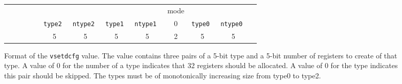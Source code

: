 \begin{figure}[b]
  \centering
  \begin{tabular}{p{1cm}p{1cm}ccc|c|c|c|c|c|c|c|l}
    \multicolumn{1}{c}{} &
    \multicolumn{1}{c}{} &
    \multicolumn{1}{c}{} &
    \multicolumn{1}{c}{} & 
    \multicolumn{1}{c}{} &
    \multicolumn{1}{c}{} &
    \multicolumn{1}{c}{} &
    \multicolumn{1}{c}{} &
    \multicolumn{1}{c}{} &
    \multicolumn{1}{c}{mode} &
    \multicolumn{1}{c}{} &
    \multicolumn{1}{c}{} &  \\
    \cline{6-12}
    & & & & &
    \tt type2 & \tt ntype2 &
    \tt type1 & \tt ntype1 &
    0 &
    \tt type0 & \tt ntype0 &  \\
    \cline{6-12}
    \multicolumn{1}{c}{} &
    \multicolumn{1}{c}{} &
    \multicolumn{1}{c}{} &
    \multicolumn{1}{c}{} & 
    \multicolumn{1}{c}{} &
    \multicolumn{1}{c}{5} &
    \multicolumn{1}{c}{5} &
    \multicolumn{1}{c}{5} &
    \multicolumn{1}{c}{5} &
    \multicolumn{1}{c}{2} &
    \multicolumn{1}{c}{5} &
    \multicolumn{1}{c}{5} &  \\
  \end{tabular}
  \caption{Format of the {\tt vsetdcfg} value.  The value contains
    three pairs of a 5-bit type and a 5-bit number of registers
    to create of that type. A value of 0 for the number of a type
    indicates that 32 registers should be allocated.  A value of 0 for
    the type indicates this pair should be skipped.  The types must be
    of monotonically increasing size from type0 to type2. }
  \label{fig:vcfg}
\end{figure}

